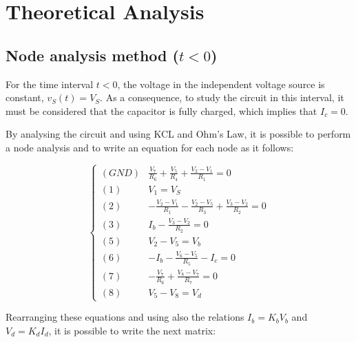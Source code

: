 \section{Theoretical Analysis}
\label{sec:analysis}

\subsection{Node analysis method ($t < 0$)}
\label{sec:node}

For the time interval $t < 0$, the voltage in the independent voltage source is constant, $v_S(t) = V_S$. As a consequence, to study the circuit in this interval, it must be considered that the capacitor is fully charged, which implies that $I_c = 0$.

By analysing the circuit and using KCL and Ohm's Law, it is possible to perform a node analysis and to write an equation for each node as it follows:

\begin{equation}
  \begin{cases}
    (GND) & \frac{V_7}{R_6} + \frac{V_5}{R_4} + \frac{V_2-V_1}{R_1} = 0 \\
    (1) & V_1 = V_S \\
    (2) & -\frac{V_2-V_1}{R_1} - \frac{V_2-V_5}{R_3} + \frac{V_3-V_2}{R_2} = 0 \\
    (3) & I_b - \frac{V_3-V_2}{R_2} = 0 \\
    (5) & V_2-V_5 = V_b \\
    (6) & -I_b - \frac{V_6-V_5}{R_5} - I_c = 0 \\
    (7) & -\frac{V_7}{R_6} + \frac{V_8-V_7}{R_7} = 0 \\
    (8) & V_5-V_8 = V_d
  \end{cases}
\end{equation}

Rearranging these equations and using also the relations $I_b = K_bV_b$ and $V_d = K_dI_d$, it is possible to write the next matrix:

